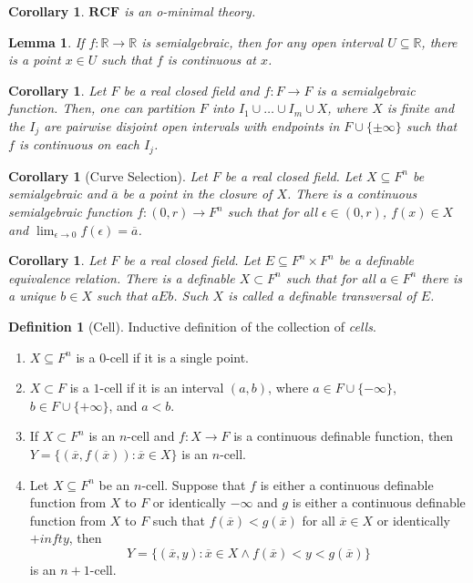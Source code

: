 \documentclass{amsart}
\newtheorem{lemma}[theorem]{Lemma}
\newtheorem{corollary}[theorem]{Corollary}
\theoremstyle{definition}
\newtheorem{definition}[theorem]{Definition}
\numberwithin{equation}{section}
\begin{document}
\begin{corollary}
  $\mathbf{RCF}$ is an o-minimal theory.
\end{corollary}

\begin{lemma}
  If $f:\mathbb{R} \to \mathbb{R}$ is semialgebraic,
  then for any open interval $U \subseteq \mathbb{R}$,
  there is a point $x\in U$ such that $f$ is continuous at $x$.
\end{lemma}

\begin{corollary}
  Let $F$ be a real closed field and $f: F \to F$ is a semialgebraic function.
  Then, one can partition $F$ into $I_1\cup \dots \cup I_m\cup X$,
  where $X$ is finite and the $I_j$ are pairwise disjoint open intervals with endpoints in $F\cup \{\pm\infty\}$
  such that $f$ is continuous on each $I_j$.
\end{corollary}

\begin{corollary}[Curve Selection]
  Let $F$ be a real closed field.
  Let $X \subseteq F^n$ be semialgebraic and $\overline{a}$
  be a point in the closure of $X$.
  There is a continuous semialgebraic function $f:(0,r) \to F^n$
  such that for all $\epsilon\in(0,r)$, $f(x) \in X$ and $\lim_{\epsilon\to 0} f(\epsilon) = \overline{a}$.
\end{corollary}

\begin{corollary}
  Let $F$ be a real closed field.
  Let $E \subseteq F^n \times F^n$ be a definable equivalence relation.
  There is a definable $X \subset F^n$ such that for all 
  $a \in F^n$ there is a unique $b\in X$ such that $aEb$.
  Such $X$ is called a definable \emph{transversal} of $E$.
\end{corollary}

\begin{definition}[Cell]
  Inductive definition of the collection of \emph{cells}.
  \begin{enumerate}[label = {$\bullet$}]
    \item $X \subseteq F^n$ is a $0$-cell if it is a single point.
    \item $X \subset F$ is a $1$-cell if it is an interval $(a,b)$,
      where $a \in F \cup \{-\infty\}$, $b\in F\cup \{+\infty\}$, and $a < b$.
    \item If $X \subset F^n$ is an $n$-cell and $f: X\to F$ is a continuous definable function,
      then $Y = \{(\overline{x},f(\overline{x})): \overline{x} \in X\}$ is an $n$-cell.
    \item Let $X \subseteq F^n$ be an $n$-cell. Suppose that $f$ is
      either a continuous definable function from $X$ to $F$ or identically $-\infty$ and
      $g$ is either a continuous definable function from $X$ to $F$
      such that $f(\overline{x}) < g(\overline{x})$ for all $\overline{x} \in X$ or identically $+infty$, then 
      \[
        Y = \{(\overline{x},y): \overline{x} \in X \land f(\overline{x}) < y < g(\overline{x})\}
      \]
      is an $n+1$-cell.
  \end{enumerate}
\end{definition}
\end{document}
